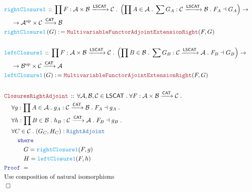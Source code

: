 \documentclass[12pt]{scrartcl}
\newcommand{\TYPE}[1]{\textcolor{NavyBlue}{\mathtt{#1}}}
\newcommand{\FUNC}[1]{\textcolor{Cerulean}{\mathtt{#1}}}
\newcommand{\LOGIC}[1]{\textcolor{Blue}{\mathtt{#1}}}
\newcommand{\THM}[1]{\textcolor{Maroon}{\mathtt{#1}}}
\renewcommand{\.}{\; . \;}
\newcommand{\de}{: \kern 0.1pc =}
\newcommand{\where}{\LOGIC{where}}
\newcommand{\Act}[1]{\left( #1 \right)}
\newcommand{\Theorem}[2]{& \THM{#1} \, :: \, #2 \\ & \Proof = \\ }
\newcommand{\DeclareFunc}[2]{& \FUNC{#1} \, :: \, #2 \\}
\newcommand{\DefineFunc}[3]{&  \FUNC{#1}\Act{#2} \de #3 \\}
\newcommand{\NewLine}{\\ & \kern 1pc}
\newcommand{\Page}[1]{ \begin{align*} #1 \end{align*}   }
\newcommand{\Arrow}{\xrightarrow}
\newcommand{\QED}{\; \square}
\newcommand{\EndProof}{& \QED \\}
\newcommand{\Proof}{\LOGIC{Proof} \; }
\newcommand{\op}{\mathrm{op}}
\newcommand{\C}{\mathcal{C}}
\newcommand{\A}{\mathcal{A}}
\newcommand{\B}{\mathcal{B}}
\newcommand{\CAT}{\mathsf{CAT}}
\begin{document}
\Page{
	\DeclareFunc{rightClosure1}{  
		\prod F : \A \times \B \Arrow{\mathsf{LSCAT}} \C \. 
		 \left( \prod A \in \A \. \sum G_A : \C \Arrow{\mathsf{LSCAT}} \B \. F_A \dashv G_A   \right)  \to \NewLine \to
		 \A^\op \times \C \Arrow{\CAT} \B
		}
	\DefineFunc{rightClosure1}{G}{\THM{MultivariableFunctorAdjointExtensionRight}(F,G)}
	\\
	\DeclareFunc{leftClosure1}{  
		\prod F : \A \times \B \Arrow{\mathsf{LSCAT}} \C \. 
		 \left( \prod B \in \B \. \sum G_B : \C \Arrow{\mathsf{LSCAT}} \A \. F_B \dashv G_B   \right)  \to \NewLine \to
		 \B^\op \times \C \Arrow{\CAT} \A
		}
	\DefineFunc{leftClosure1}{G}{\THM{MultivariableFunctorAjointExtensionRight}(F,G)}
	\\
	\Theorem{ClosuresRightAdjoint}{
			\forall \A, \B, \C \in \mathsf{LSCAT} \.
			\forall F : \A \times \B \Arrow{\CAT} \C \. \NewLine
			\forall g : \prod A \in \A \. g_A : \C \Arrow{\CAT} \B \. F_A \dashv g_A \. \NewLine
			\forall h : \prod B \in \B \. h_B : \C \Arrow{\CAT} \A \. F_B \dashv g_B \. \NewLine
			\forall C \in \C \. (G_C,H_C) : \TYPE{RightAdjoint} \NewLine \quad \where \NewLine
			 \quad \quad G = \FUNC{rightClosure1}(F,g) \NewLine
			 \quad \quad H = \FUNC{leftClosure1}(F,h)                                                        
			}
			& \text{Use composition of natural isomorphisms} \\
			\EndProof
}
\newpage
\end{document}
